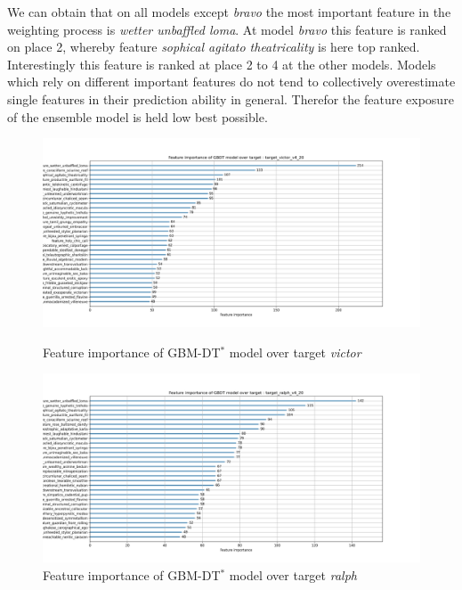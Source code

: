 \documentclass[12pt, a4paper]{article}
\begin{document}
We can obtain that on all models except \textit{bravo} the most important feature in the weighting process is \textit{wetter unbaffled loma}.
At model \textit{bravo} this feature is ranked on place 2, whereby feature \textit{sophical agitato theatricality} is here top ranked. Interestingly this feature is ranked at place 2 to 4 at the other models. Models which rely on different important features do not tend to collectively overestimate single features in their prediction ability in general. Therefor the feature exposure of the ensemble model is held low best possible.
\begin{figure}[htbp]
\begin{minipage}[t]{9cm}
\vspace{0pt}
\centering
\includegraphics[width=1\textwidth,trim={0 0 0 0},clip]{rounds/2024-01-17_round1_feature_importance_target_victor_v4_20.png}
\caption[Feature importance of model victor]{Feature importance of GBM-DT$^{\ast}$ model over target \textit{victor}}
\label{fig: fi_victor}
\end{minipage}
\hfill
\begin{minipage}[t]{9cm}
\vspace{0pt}
\centering
\includegraphics[width=1\textwidth,trim={0 0 0 0},clip]{rounds/2024-01-17_round1_feature_importance_target_ralph_v4_20.png}
\caption[Feature importance of model ralph]{Feature importance of GBM-DT$^{\ast}$ model over target \textit{ralph}}
\label{fig: fi_ralph}
\end{minipage}
\end{figure}
\end{document}
